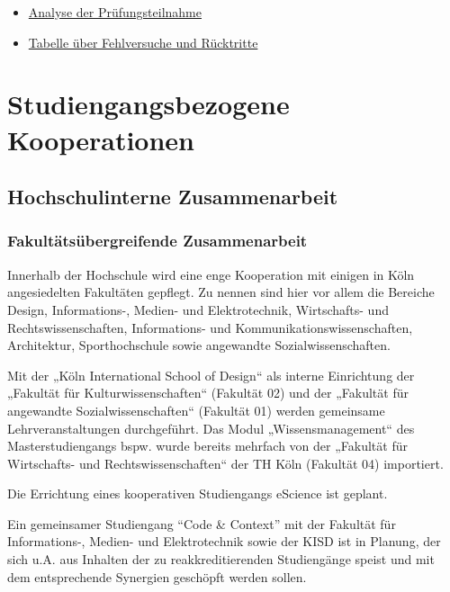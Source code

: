 \begin{itemize}
\tightlist
\item
  \href{https://th-koeln.github.io/mi-2017/anhaenge/ba-pruefungsplan_mi.pdf}{Analyse der
  Prüfungsteilnahme}
\item
  \href{https://th-koeln.github.io/mi-2017/anhaenge/ba-pruefungen-fehlversuche-und-ruecktritte.pdf}{Tabelle
  über Fehlversuche und Rücktritte}
\end{itemize}

\chapter{Studiengangsbezogene
Kooperationen}\label{studiengangsbezogene-kooperationen}

\section{Hochschulinterne
Zusammenarbeit}\label{hochschulinterne-zusammenarbeit}

\subsection{Fakultätsübergreifende
Zusammenarbeit}\label{fakultuxe4tsuxfcbergreifende-zusammenarbeit}

Innerhalb der Hochschule wird eine enge Kooperation mit einigen in Köln
angesiedelten Fakultäten gepflegt. Zu nennen sind hier vor allem die
Bereiche Design, Informations-, Medien- und Elektrotechnik, Wirtschafts-
und Rechtswissenschaften, Informations- und
Kommunikationswissenschaften, Architektur, Sporthochschule sowie
angewandte Sozialwissenschaften.

Mit der „Köln International School of Design`` als interne Einrichtung
der „Fakultät für Kulturwissenschaften`` (Fakultät 02) und der „Fakultät
für angewandte Sozialwissenschaften`` (Fakultät 01) werden gemeinsame
Lehrveranstaltungen durchgeführt. Das Modul „Wissensmanagement`` des
Masterstudiengangs bspw. wurde bereits mehrfach von der „Fakultät für
Wirtschafts- und Rechtswissenschaften`` der TH Köln (Fakultät 04)
importiert.

Die Errichtung eines kooperativen Studiengangs eScience ist geplant.

Ein gemeinsamer Studiengang ``Code \& Context'' mit der Fakultät für
Informations-, Medien- und Elektrotechnik sowie der KISD ist in Planung,
der sich u.A. aus Inhalten der zu reakkreditierenden Studiengänge speist
und mit dem entsprechende Synergien geschöpft werden sollen.

